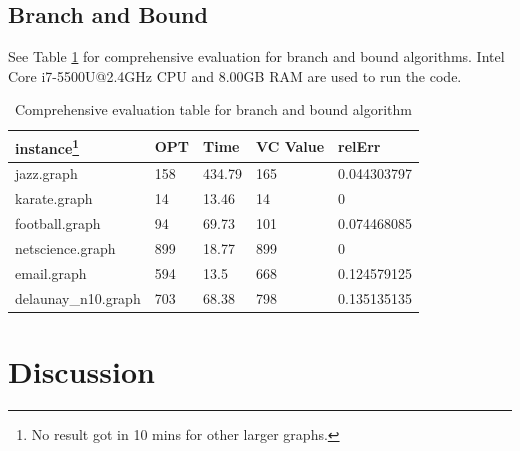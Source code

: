 \subsection{Branch and Bound}
See Table \ref{tab3} for comprehensive evaluation for branch and bound algorithms. Intel Core i7-5500U@2.4GHz CPU and 8.00GB RAM are used to run the code.
\begin{table}[htb]
\caption{Comprehensive evaluation table for branch and bound algorithm}
\label{tab3}
\begin{minipage}{\columnwidth}
\begin{center}
\begin{tabular}{@{}lllll@{}}
\toprule
instance\footnote{No result got in 10 mins for other larger graphs.} & OPT & Time   & VC Value & relErr      \\ \midrule
jazz.graph          & 158 & 434.79 & 165      & 0.044303797 \\
karate.graph        & 14  & 13.46  & 14       & 0           \\
football.graph      & 94  & 69.73  & 101      & 0.074468085 \\
netscience.graph    & 899 & 18.77  & 899      & 0           \\
email.graph         & 594 & 13.5   & 668      & 0.124579125 \\
delaunay\_n10.graph & 703 & 68.38  & 798      & 0.135135135 \\ \bottomrule
\end{tabular}
\end{center}
\end{minipage}
\end{table}

\section{Discussion}
